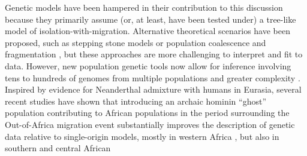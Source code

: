 \documentclass[]{article}
\begin{document}
Genetic models have been hampered in their contribution to this discussion
because they primarily assume (or, at least, have been tested under) a
tree-like model of isolation-with-migration. Alternative theoretical scenarios
have been proposed, such as stepping stone models \citep{Arredondo2021-qa} or
population coalescence and fragmentation \citep{Scerri2019-xg}, but these
approaches are more challenging to interpret and fit to data.
However, new population genetic tools now allow for inference involving tens to
hundreds of genomes from multiple populations and greater complexity
\citep{Kamm2020-vn,Ragsdale2019-nt,Speidel2019-nj}. Inspired by evidence for
Neanderthal admixture with humans in Eurasia, several recent studies
have shown that introducing an archaic hominin ``ghost'' population contributing to 
African populations in the period surrounding the Out-of-Africa migration event
substantially improves the description of genetic data relative to
single-origin models, mostly in western Africa
\citep{Plagnol2006-lt,Hammer2011-bx,Hey2018-pw,Ragsdale2019-nt,
Lorente-Galdos2019-vz,Durvasula2020-td},
%
%
%
%
%
but also in southern \cite{Hammer2011-bx,Lorente-Galdos2019-vz} 
and central African \cite{Hsieh2016-gk, Hammer2011-bx,Lorente-Galdos2019-vz,Hey2018-pw}
\end{document}
